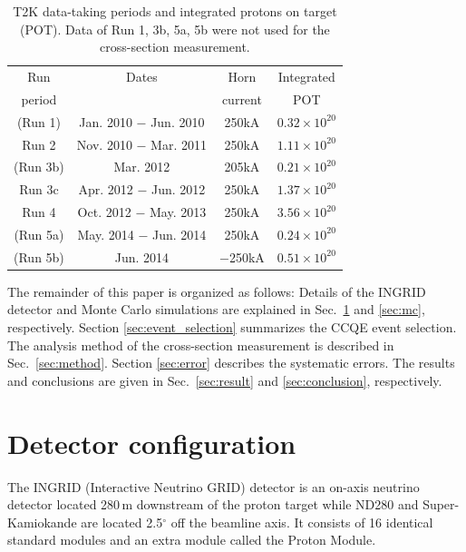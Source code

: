 \documentclass[%
 reprint,
superscriptaddress,
 amsmath,amssymb,
 aps,
]{revtex4-1}
\begin{document}
\begin{table}[htbp]
\begin{center}
  \caption{T2K data-taking periods and integrated
protons on target (POT). Data of Run 1, 3b, 5a, 5b were not used for the cross-section measurement.}
  \begin{tabular}{cccc}
    \hline\hline
     Run & Dates & Horn & Integrated\\ 
     period & & current & POT \\ 
    \hline
     (Run 1) & Jan. 2010 $-$ Jun. 2010 & 250kA &$0.32\times10^{20}$\\ 
     Run 2 & Nov. 2010 $-$ Mar. 2011 & 250kA &$1.11\times10^{20}$\\
     (Run 3b) & Mar. 2012 & 205kA &$0.21\times10^{20}$\\
     Run 3c & Apr. 2012 $-$ Jun. 2012 & 250kA &$1.37\times10^{20}$\\
     Run 4 & Oct. 2012 $-$ May. 2013 & 250kA &$3.56\times10^{20}$\\
     (Run 5a) & May. 2014 $-$ Jun. 2014 & 250kA & $0.24\times10^{20}$\\
     (Run 5b) & Jun. 2014 & $-$250kA & $0.51\times10^{20}$\\
    \hline\hline
  \end{tabular}
  \label{dataset}
  \end{center}
\end{table}

The remainder of this paper is organized as follows:
Details of the INGRID detector and Monte Carlo simulations are explained in Sec.\ \ref{sec:detector} and \ref{sec:mc}, respectively.
Section \ref{sec:event_selection} summarizes the CCQE event selection.
The analysis method of the cross-section measurement is described in Sec.\ \ref{sec:method}.
Section \ref{sec:error} describes the systematic errors.
The results and conclusions are given in Sec.\ \ref{sec:result} and \ref{sec:conclusion}, respectively.

\section{Detector configuration}\label{sec:detector}
The INGRID (Interactive Neutrino GRID) detector is an on-axis neutrino detector located 280\,m downstream of the proton target while ND280 and Super-Kamiokande are located 2.5$^\circ$ off the beamline axis.
It consists of 16 identical standard modules and an extra module called the Proton Module.
\end{document}
